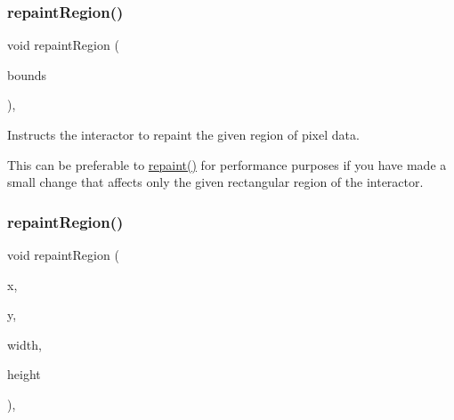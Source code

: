 \mbox{\label{classsgl_1_1GDrawingSurface_a769c46fb3e1004aec76e8b0adfa42aa6}} 
\subsubsection{\texorpdfstring{repaint\+Region()}{repaintRegion()}\hspace{0.1cm}{\footnotesize\ttfamily [1/2]}}
{\footnotesize\ttfamily void repaint\+Region (\begin{DoxyParamCaption}\item[{const \mbox{\hyperlink{structsgl_1_1GRectangle}{G\+Rectangle}} \&}]{bounds }\end{DoxyParamCaption})\hspace{0.3cm}{\ttfamily [virtual]}, {\ttfamily [inherited]}}



Instructs the interactor to repaint the given region of pixel data. 

This can be preferable to \mbox{\hyperlink{classsgl_1_1GCanvas_afb8dbc55702230f0030e47d6c009697f}{repaint()}} for performance purposes if you have made a small change that affects only the given rectangular region of the interactor. \mbox{\label{classsgl_1_1GCanvas_a63af8fca5bf186367132ecf6af6f5eea}} 
\subsubsection{\texorpdfstring{repaint\+Region()}{repaintRegion()}\hspace{0.1cm}{\footnotesize\ttfamily [2/2]}}
{\footnotesize\ttfamily void repaint\+Region (\begin{DoxyParamCaption}\item[{int}]{x,  }\item[{int}]{y,  }\item[{int}]{width,  }\item[{int}]{height }\end{DoxyParamCaption})\hspace{0.3cm}{\ttfamily [override]}, {\ttfamily [virtual]}}



